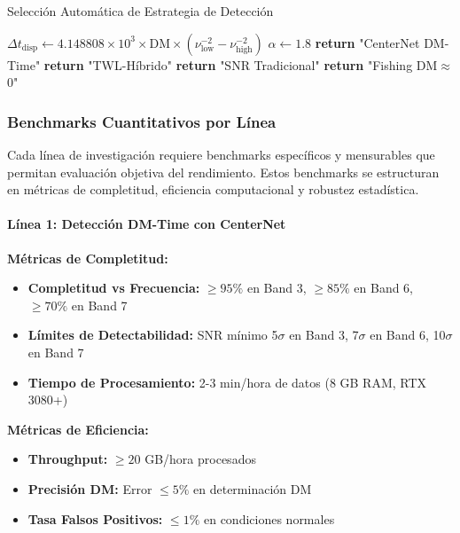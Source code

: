 \begin{algorithm}[H]
\caption{Selección Automática de Estrategia de Detección}
\begin{algorithmic}[1]
    \State $\Delta t_{\text{disp}} \leftarrow 4.148808 \times 10^3 \times \text{DM} \times (\nu_{\text{low}}^{-2} - \nu_{\text{high}}^{-2})$
    \State $\alpha \leftarrow 1.8$ 
        \State \textbf{return} "CenterNet DM-Time"
        \State \textbf{return} "TWL-Híbrido"
        \State \textbf{return} "SNR Tradicional"
    \Else
        \State \textbf{return} "Fishing DM$\approx$0"
    \EndIf
\EndFunction
\end{algorithmic}
\end{algorithm}

\subsubsection{Benchmarks Cuantitativos por Línea}

Cada línea de investigación requiere benchmarks específicos y mensurables que permitan evaluación objetiva del rendimiento. Estos benchmarks se estructuran en métricas de completitud, eficiencia computacional y robustez estadística.

\paragraph{Línea 1: Detección DM-Time con CenterNet}

\textbf{Métricas de Completitud:}
\begin{itemize}
\item \textbf{Completitud vs Frecuencia:} $\geq 95\%$ en Band 3, $\geq 85\%$ en Band 6, $\geq 70\%$ en Band 7
\item \textbf{Límites de Detectabilidad:} SNR mínimo 5$\sigma$ en Band 3, 7$\sigma$ en Band 6, 10$\sigma$ en Band 7
\item \textbf{Tiempo de Procesamiento:} 2-3 min/hora de datos (8 GB RAM, RTX 3080+)
\end{itemize}

\textbf{Métricas de Eficiencia:}
\begin{itemize}
\item \textbf{Throughput:} $\geq 20$ GB/hora procesados
\item \textbf{Precisión DM:} Error $\leq 5\%$ en determinación DM
\item \textbf{Tasa Falsos Positivos:} $\leq 1\%$ en condiciones normales
\end{itemize}

